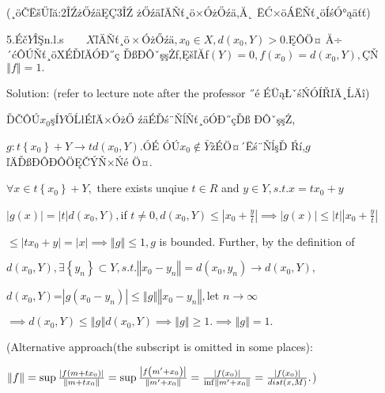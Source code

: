 \documentclass{article}
\begin{document}
\begin{CJK}{GBK}{song}
(¸öČËšŰľă:2ÎŹżŐźäĘÇ3ÎŹ%
żŐźäľÄŇť¸ö×ÓżŐźä,Ă˛%
ËĆ×öÁËŇť¸öÍśÓ°ąäťť)

\bigskip

5.Éč$Y$ÎŞn.l.s$\qquad XľÄ Ňť ¸ö ×Ó 
żŐ źä ,x_{0}\in X,d\left( x_{0},Y\right) >0.$ĘÔÖ¤%
Ă÷´ćÔÚŇť¸öXÉĎľÄÓĐ˝ç%
ĎßĐÔˇşşŻf,ĘšľĂf$\left( Y\right)
=0,f\left( x_{0}\right) =d\left( x_{0},Y\right) ,$ÇŇ$\left\Vert
f\right\Vert =1.$

\bigskip Solution: (refer to lecture note after the professor ˝é%
ÉÜąŁˇśŃÓÍŘľÄ¸ĹÄî)

ĎČÔÚ$x_{0}$şÍ$Y$ŐĹłÉľÄ×ÓżŐ%
źäÉĎś¨ŇĺŇť¸öÓĐ˝çĎß%
ĐÔˇşşŻ,

$g:t\left\{ x_{0}\right\} +Y\rightarrow td\left( x_{0},Y\right) .$ÓÉ%
ÓÚ$x_{0}\notin \bar{Y}$żÉÖ¤´Ëś¨ŇĺşĎ%
Ŕí,$g$ ľÄĎßĐÔĐÔÖĘČÝŇ×Ńé%
Ö¤.

\bigskip $\forall x\in t\left\{ x_{0}\right\} +Y,$ there exists unqiue $t\in
R$ and $y\in Y,s.t.x=tx_{0}+y$

$\left\vert g\left( x\right) \right\vert =\left\vert t\right\vert d\left(
x_{0},Y\right) ,$if $t\neq 0,d\left( x_{0},Y\right) \leq \left\vert x_{0}+%
\frac{y}{t}\right\vert \implies \left\vert g\left( x\right) \right\vert \leq
\left\vert t\right\vert \left\vert x_{0}+\frac{y}{t}\right\vert $

$\leq \left\vert tx_{0}+y\right\vert =\left\vert x\right\vert \implies
\left\Vert g\right\Vert \leq 1,g$ is bounded. Further, by the definition of

$d\left( x_{0},Y\right) ,\exists \left\{ y_{n}\right\} \subset
Y,s.t.\left\Vert x_{0}-y_{n}\right\Vert =d\left( x_{0},y_{n}\right)
\rightarrow d\left( x_{0},Y\right) ,$

$d\left( x_{0},Y\right) $=$\left\vert g\left( x_{0}-y_{n}\right) \right\vert
\leq \left\Vert g\right\Vert \left\Vert x_{0}-y_{n}\right\Vert ,$let $%
n\rightarrow \infty $

$\implies d\left( x_{0},Y\right) \leq \left\Vert g\right\Vert d\left(
x_{0},Y\right) \implies \left\Vert g\right\Vert \geq 1.\implies \left\Vert
g\right\Vert =1.$

\bigskip (Alternative approach(the subscript is omitted in some places):

$\left\Vert f\right\Vert =\sup \frac{\left\vert f\left( m+tx_{0}\right)
\right\vert }{\left\Vert m+tx_{0}\right\Vert }=\sup \frac{\left\vert f\left(
m^{\prime }+x_{0}\right) \right\vert }{\left\Vert m^{\prime
}+x_{0}\right\Vert }=\frac{\left\vert f\left( x_{0}\right) \right\vert }{%
\inf \left\Vert m^{\prime }+x_{0}\right\Vert }=\frac{\left\vert f\left(
x_{0}\right) \right\vert }{dist\left( x,M\right) }.$)


\end{CJK}
\end{document}
